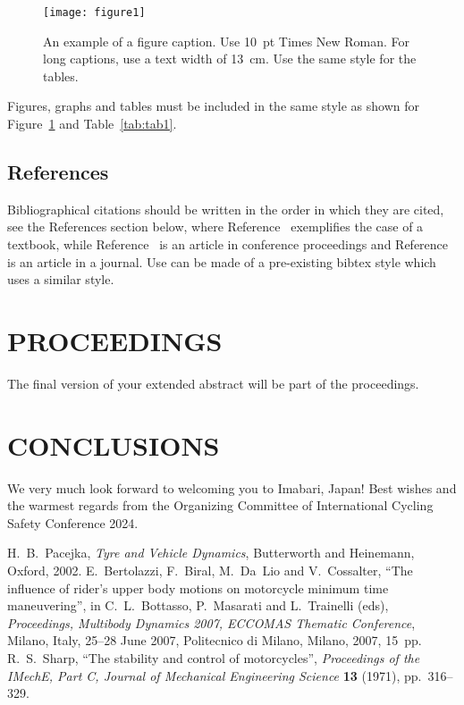 \documentclass{icsc}
\begin{document}
\begin{figure}[h!]
\begin{center}
  \texttt{[image: figure1]}
  \caption{An example of a figure caption. Use 10~pt Times New Roman.
           For long captions, use a text width of 13~cm.
           Use the same style for the tables.} \label{fig:fig1}
\end{center}
\end{figure}
Figures, graphs and tables must be included in the same style as shown for
Figure~\ref{fig:fig1} and Table~\ref{tab:tab1}.

\subsection{References}
%
Bibliographical citations should be written in the order in which they are
cited, see the References section below, where Reference~\cite{Pac02}
exemplifies the case of a textbook, while Reference~\cite{Ber07} is an article
in conference proceedings and Reference~\cite{Sha71} is an article in a
journal. Use can be made of a pre-existing bibtex style which uses a similar
style.

\thispagestyle{empty}

\section{PROCEEDINGS}
%
The final version of your extended abstract will be part of the proceedings.

\section{CONCLUSIONS}
%
We very much look forward to welcoming you to Imabari, Japan! Best wishes and
the warmest regards from the Organizing Committee of International Cycling
Safety Conference 2024.

\begin{thebibliography}{6}
   H.~B.~Pacejka, \textit{Tyre and Vehicle Dynamics},
    Butterworth and Heinemann, Oxford, 2002.
   E.~Bertolazzi, F.~Biral, M.~Da~Lio and V.~Cossalter, ``The
    influence of rider's upper body motions on motorcycle minimum time
    maneuvering'', in C.~L.~Bottasso, P.~Masarati and L.~Trainelli (eds),
    \textit{Proceedings, Multibody Dynamics 2007, ECCOMAS Thematic Conference},
    Milano, Italy, 25--28 June 2007, Politecnico di Milano, Milano, 2007,
    15~pp.
   R.~S.~Sharp, ``The stability and control of motorcycles'',
    \textit{Proceedings of the IMechE, Part C, Journal of Mechanical
    Engineering Science} \textbf{13} (1971), pp.~316--329.
\end{thebibliography}
\thispagestyle{empty}
\end{document}
